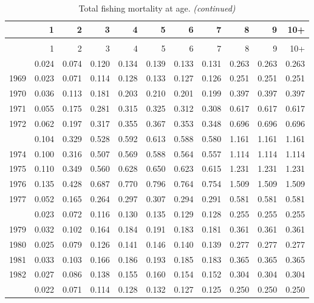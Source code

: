 \documentclass[
]{article}
\begin{document}
\begin{longtable}[t]{lrrrrrrrrrr}
\caption{\label{tab:FAA-tot-table}Total fishing mortality at age.}\\
\toprule
  & 1 & 2 & 3 & 4 & 5 & 6 & 7 & 8 & 9 & 10+\\
\midrule
\endfirsthead
\caption[]{Total fishing mortality at age. \textit{(continued)}}\\
\toprule
  & 1 & 2 & 3 & 4 & 5 & 6 & 7 & 8 & 9 & 10+\\
\midrule
\endhead

\endfoot
\bottomrule
\endlastfoot
1968 & 0.024 & 0.074 & 0.120 & 0.134 & 0.139 & 0.133 & 0.131 & 0.263 & 0.263 & 0.263\\
1969 & 0.023 & 0.071 & 0.114 & 0.128 & 0.133 & 0.127 & 0.126 & 0.251 & 0.251 & 0.251\\
1970 & 0.036 & 0.113 & 0.181 & 0.203 & 0.210 & 0.201 & 0.199 & 0.397 & 0.397 & 0.397\\
1971 & 0.055 & 0.175 & 0.281 & 0.315 & 0.325 & 0.312 & 0.308 & 0.617 & 0.617 & 0.617\\
1972 & 0.062 & 0.197 & 0.317 & 0.355 & 0.367 & 0.353 & 0.348 & 0.696 & 0.696 & 0.696\\
\addlinespace
1973 & 0.104 & 0.329 & 0.528 & 0.592 & 0.613 & 0.588 & 0.580 & 1.161 & 1.161 & 1.161\\
1974 & 0.100 & 0.316 & 0.507 & 0.569 & 0.588 & 0.564 & 0.557 & 1.114 & 1.114 & 1.114\\
1975 & 0.110 & 0.349 & 0.560 & 0.628 & 0.650 & 0.623 & 0.615 & 1.231 & 1.231 & 1.231\\
1976 & 0.135 & 0.428 & 0.687 & 0.770 & 0.796 & 0.764 & 0.754 & 1.509 & 1.509 & 1.509\\
1977 & 0.052 & 0.165 & 0.264 & 0.297 & 0.307 & 0.294 & 0.291 & 0.581 & 0.581 & 0.581\\
\addlinespace
1978 & 0.023 & 0.072 & 0.116 & 0.130 & 0.135 & 0.129 & 0.128 & 0.255 & 0.255 & 0.255\\
1979 & 0.032 & 0.102 & 0.164 & 0.184 & 0.191 & 0.183 & 0.181 & 0.361 & 0.361 & 0.361\\
1980 & 0.025 & 0.079 & 0.126 & 0.141 & 0.146 & 0.140 & 0.139 & 0.277 & 0.277 & 0.277\\
1981 & 0.033 & 0.103 & 0.166 & 0.186 & 0.193 & 0.185 & 0.183 & 0.365 & 0.365 & 0.365\\
1982 & 0.027 & 0.086 & 0.138 & 0.155 & 0.160 & 0.154 & 0.152 & 0.304 & 0.304 & 0.304\\
\addlinespace
1983 & 0.022 & 0.071 & 0.114 & 0.128 & 0.132 & 0.127 & 0.125 & 0.250 & 0.250 & 0.250\\

\end{longtable}
\end{document}

